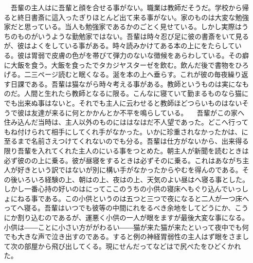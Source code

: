 \documentclass[a5j]{ltjbook}
\begin{document}
　吾輩の主人はに吾輩と顔を合せる事がない。職業は教師だそうだ。学校から帰ると終日書斎に這入ったぎりほとんど出て来る事がない。家のものは大変な勉強家だと思っている。当人も勉強家であるかのごとく見せている。しかし実際はうちのものがいうような勤勉家ではない。吾輩は時々忍び足に彼の書斎をいて見るが、彼はよくをしている事がある。時々読みかけてある本の上にをたらしている。彼は胃弱で皮膚の色がを帯びて弾力のないな徴候をあらわしている。その癖に大飯を食う。大飯を食ったでタカジヤスターゼを飲む。飲んだ後で書物をひろげる。二三ページ読むと眠くなる。涎を本の上へ垂らす。これが彼の毎夜繰り返す日課である。吾輩は猫ながら時々考える事がある。教師というものは実になものだ。人間と生れたら教師となるに限る。こんなに寝ていて勤まるものなら猫にでも出来ぬ事はないと。それでも主人に云わせると教師ほどつらいものはないそうで彼は友達が来るに何とかかんとか不平を鳴らしている。 \newline
　吾輩がこの家へ住み込んだ当時は、主人以外のものにははなはだ不人望であった。どこへ行ってもね付けられて相手にしてくれ手がなかった。いかに珍重されなかったかは、に至るまで名前さえつけてくれないのでも分る。吾輩は仕方がないから、出来得る限り吾輩を入れてくれた主人のにいる事をつとめた。朝主人が新聞を読むときは必ず彼のの上に乗る。彼が昼寝をするときは必ずそのに乗る。これはあながち主人が好きという訳ではないが別に構い手がなかったからやむを得んのである。その後いろいろ経験の上、朝はの上、夜はの上、天気のよい昼はへ寝る事とした。しかし一番心持の好いのはにってここのうちの小供の寝床へもぐり込んでいっしょにねる事である。この小供というのは五つと三つで夜になると二人が一つ床へってへ寝る。吾輩はいつでも彼等の中間にれをるべき余地をしてどうにか、こうにか割り込むのであるが、運悪く小供の一人が眼をますが最後大変な事になる。小供は――ことに小さい方ががわるい――猫が来た猫が来たといって夜中でも何でも大きな声で泣き出すのである。すると例の神経胃弱性の主人はず眼をさまして次の部屋から飛び出してくる。現にせんだってなどはで尻ぺたをひどくかれた。 \newline
\end{document}
